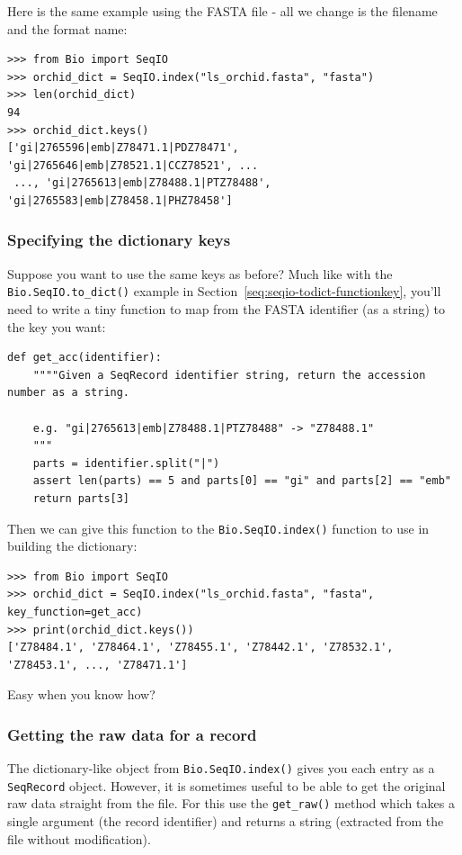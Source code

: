 \documentclass{report}
\begin{document}
Here is the same example using the FASTA file - all we change is the
filename and the format name:

\begin{verbatim}
>>> from Bio import SeqIO
>>> orchid_dict = SeqIO.index("ls_orchid.fasta", "fasta")
>>> len(orchid_dict)
94
>>> orchid_dict.keys()
['gi|2765596|emb|Z78471.1|PDZ78471', 'gi|2765646|emb|Z78521.1|CCZ78521', ...
 ..., 'gi|2765613|emb|Z78488.1|PTZ78488', 'gi|2765583|emb|Z78458.1|PHZ78458']
\end{verbatim}

\subsubsection{Specifying the dictionary keys}
\label{seq:seqio-index-functionkey}

Suppose you want to use the same keys as before? Much like with the
\verb|Bio.SeqIO.to_dict()| example in Section~\ref{seq:seqio-todict-functionkey},
you'll need to write a tiny function to map from the FASTA identifier
(as a string) to the key you want:

\begin{verbatim}
def get_acc(identifier):
    """"Given a SeqRecord identifier string, return the accession number as a string.
  
    e.g. "gi|2765613|emb|Z78488.1|PTZ78488" -> "Z78488.1"
    """
    parts = identifier.split("|")
    assert len(parts) == 5 and parts[0] == "gi" and parts[2] == "emb"
    return parts[3]
\end{verbatim}

\noindent Then we can give this function to the \verb|Bio.SeqIO.index()|
function to use in building the dictionary:

\begin{verbatim}
>>> from Bio import SeqIO
>>> orchid_dict = SeqIO.index("ls_orchid.fasta", "fasta", key_function=get_acc)
>>> print(orchid_dict.keys())
['Z78484.1', 'Z78464.1', 'Z78455.1', 'Z78442.1', 'Z78532.1', 'Z78453.1', ..., 'Z78471.1']
\end{verbatim}

\noindent Easy when you know how?

\subsubsection{Getting the raw data for a record}
\label{sec:seqio-index-getraw}

The dictionary-like object from \verb|Bio.SeqIO.index()| gives you each
entry as a \verb|SeqRecord| object. However, it is sometimes useful to
be able to get the original raw data straight from the file. For this
use the \verb|get_raw()| method which takes a
single argument (the record identifier) and returns a string (extracted
from the file without modification).
\end{document}
